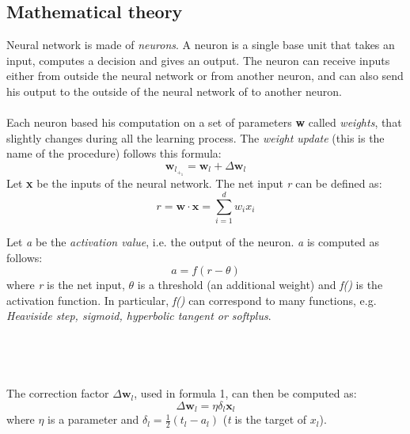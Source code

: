 \documentclass[10pt]{article}
\begin{document}
\subsection{Mathematical theory}
Neural network is made of \textit{neurons}. A neuron is a single
base unit that takes an input, computes a decision and gives
an output. The neuron can receive inputs either from outside
the neural network or from another neuron, and can also send
his output to the outside of the neural network of to another
neuron.
\\\\
Each neuron based his computation on a set of parameters
\textbf{w} called \textit{weights}, that slightly changes during all the learning
process. The \textit{weight update} (this is the name of the procedure)
follows this formula:
\begin{equation}
    \textbf{w}_l_+_1 = \textbf{w}_l + \Delta \textbf{w}_l
\end{equation}
Let \textbf{x} be the inputs of the neural network. The net input \textit{r}
can be defined as:
\begin{equation}
    r = \textbf{w} \cdot \textbf{x} = \sum_{i=1}^{d}{w_i x_i}
\end{equation}

Let \textit{a} be the \textit{activation value}, i.e. the output of the neuron. \textit{a} is computed as follows:
\begin{equation}
     a = f(r - \theta)
\end{equation}
where \textit{r} is the net input, $\theta$ is a threshold (an additional
weight) and \textit{f()} is the activation function. In particular, \textit{f()} can
correspond to many functions, e.g. \textit{Heaviside step, sigmoid,
hyperbolic tangent or softplus}.
\\\\\\\\\\
The correction factor $\Delta \textbf{w}_l$, used in formula 1, can then be
computed as:
\begin{equation}
     \Delta \textbf{w}_l = \eta \delta_l \textbf{x}_l
\end{equation}
where $\eta$ is a parameter and $\delta_l = \frac{1}{2}\left(t_l - a_l \right)$ (\textit{t} is the target of $x_l$).
\end{document}
